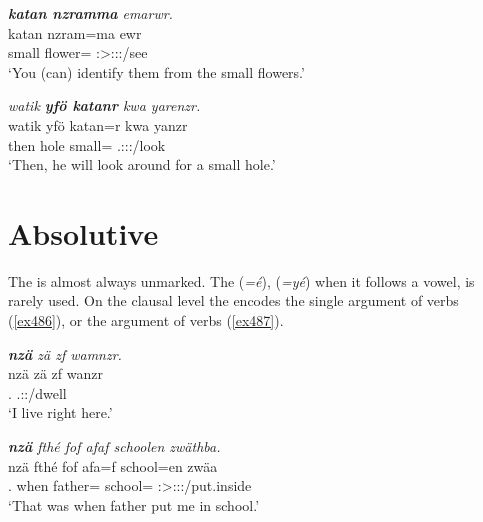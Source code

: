 \begin{exe}
	\ex \emph{\textbf{katan nzramma} emarwr.}\\
	\gll katan nzram=ma ewr\\
	small flower=\Char{} \Stsg:\Sbj>\Stpl:\Obj:\Nonpast:\Ipfv/see\\
	\trans `You (can) identify them from the small flowers.'
	\label{ex485}
\end{exe}
\begin{exe}
	\ex \emph{watik \textbf{yfö katanr} kwa yarenzr.}\\
	\gll watik yfö katan=r kwa yanzr\\
	then hole small=\Purp{} \Fut{} \Tsg.\Masc:\Sbj:\Nonpast:\Ipfv/look\\
	\trans `Then, he will look around for a small hole.'
	\label{ex484}
\end{exe}

\section{Absolutive}\label{abscase}

The   is almost always unmarked. The   (\emph{=é}), (\emph{=yé}) when it follows a vowel, is rarely used. On the clausal level the  encodes the single argument of  verbs (\ref{ex486}), or the  argument of  verbs (\ref{ex487}).

\begin{exe}
	\ex \emph{\textbf{nzä} zä zf wamnzr.}\\
	\gll nzä zä zf wanzr\\
	\Fsg.\Abs{} \Prox{} \Imm{} \Fsg.\Sbj:\Nonpast:\Ipfv/dwell\\
	\trans `I live right here.'
	\label{ex486}
\end{exe}
\begin{exe}
	\ex \emph{\textbf{nzä} fthé fof afaf schoolen zwäthba.}\\
	\gll nzä fthé fof afa=f school=en zwäa\\
	\Fsg.\Abs{} when \Emph{} father=\Erg{} school=\Loc{} \Stsg:\Sbj>\Fsg:\Obj:\Pst:\Pfv/put.inside\\
	\trans `That was when father put me in school.'
	\label{ex487}
\end{exe}
	
